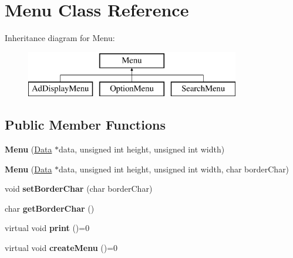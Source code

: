 \hypertarget{class_menu}{}\section{Menu Class Reference}
\label{class_menu}
Inheritance diagram for Menu\+:\begin{figure}[H]
\begin{center}
\leavevmode
\includegraphics[height=2.000000cm]{class_menu}
\end{center}
\end{figure}
\subsection*{Public Member Functions}
\begin{DoxyCompactItemize}
\item 
\hypertarget{class_menu_a8abee3b9e053fca19f831dd776bd99d1}{}{\bfseries Menu} (\hyperlink{class_data}{Data} $\ast$data, unsigned int height, unsigned int width)\label{class_menu_a8abee3b9e053fca19f831dd776bd99d1}

\item 
\hypertarget{class_menu_aaadfa629cab782a6087766f4fc7b19a6}{}{\bfseries Menu} (\hyperlink{class_data}{Data} $\ast$data, unsigned int height, unsigned int width, char border\+Char)\label{class_menu_aaadfa629cab782a6087766f4fc7b19a6}

\item 
\hypertarget{class_menu_aa0503578e77400a5609f039ed62d44e7}{}void {\bfseries set\+Border\+Char} (char border\+Char)\label{class_menu_aa0503578e77400a5609f039ed62d44e7}

\item 
\hypertarget{class_menu_afdd6e6b09535ca48838c22d5a753dcfc}{}char {\bfseries get\+Border\+Char} ()\label{class_menu_afdd6e6b09535ca48838c22d5a753dcfc}

\item 
\hypertarget{class_menu_ae1857de4af042320041da50debf81709}{}virtual void {\bfseries print} ()=0\label{class_menu_ae1857de4af042320041da50debf81709}

\item 
\hypertarget{class_menu_af71cfef966c0dfd5ecf5d585ddb16514}{}virtual void {\bfseries create\+Menu} ()=0\label{class_menu_af71cfef966c0dfd5ecf5d585ddb16514}

\end{DoxyCompactItemize}
